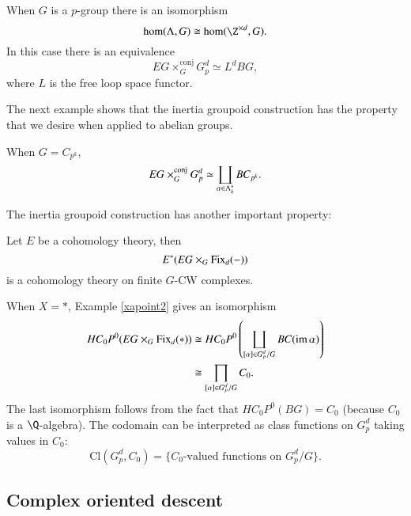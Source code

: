 \begin{example}
When $G$ is a $p$-group there is an isomorphism
\[
\hom(\Lambda,G) \cong \hom(\Z^{\times d}, G).
\]
In this case there is an equivalence
\[
EG \times_{G}^{\mathrm{conj}} G_{p}^{d} \simeq L^dBG,
\]
where $L$ is the free loop space functor. 
\end{example}

The next example shows that the inertia groupoid construction has the property that we desire when applied to abelian groups.
\begin{example} \label{zpk}
When $G = C_{p^k}$,
\[
EG \times_{G}^{\text{conj}} G_{p}^{d} \simeq \coprod_{\alpha \in \Lambda_k^*} BC_{p^k}.
\]
\end{example}

The inertia groupoid construction has another important property: 
\begin{proposition}
Let $E$ be a cohomology theory, then
\[
E^*(EG \times_G \operatorname{Fix}_d(-))
\]
is a cohomology theory on finite $G$-CW complexes.
\end{proposition}

\begin{example} \label{classfncs}
When $X = *$, Example \ref{xapoint2} gives an isomorphism
\begin{align*}
HC_{0}P^0(EG \times_G \operatorname{Fix}_d(*)) &\cong HC_{0}P^{0}\left(\coprod_{[\alpha] \in G_{p}^{d}/G} BC(\operatorname{im} \alpha)\right) \\
&\cong \prod_{[\alpha] \in G_{p}^{d}/G}C_{0}.
\end{align*}
The last isomorphism follows from the fact that $HC_{0}P^{0}(BG) = C_0$ (because $C_0$ is a $\Q$-algebra). The codomain can be interpreted as class functions on $G_{p}^{d}$ taking values in $C_0$:
\[
\mathrm{Cl}(G_{p}^{d}, C_0) = \{C_0\text{-valued functions on } G_{p}^{d}/G\}.
\]
\end{example}


\subsection*{Complex oriented descent}

